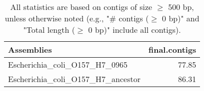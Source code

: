 \documentclass[12pt,a4paper]{article}
\begin{document}
\begin{table}[ht]
\begin{center}
\caption{All statistics are based on contigs of size $\geq$ 500 bp, unless otherwise noted (e.g., "\# contigs ($\geq$ 0 bp)" and "Total length ($\geq$ 0 bp)" include all contigs).}
\begin{tabular}{|l*{1}{|r}|}
\hline
Assemblies & final.contigs \\ \hline
Escherichia\_coli\_O157\_H7\_0965 & 77.85 \\ \hline
Escherichia\_coli\_O157\_H7\_ancestor & 86.31 \\ \hline
\end{tabular}
\end{center}
\end{table}
\end{document}
